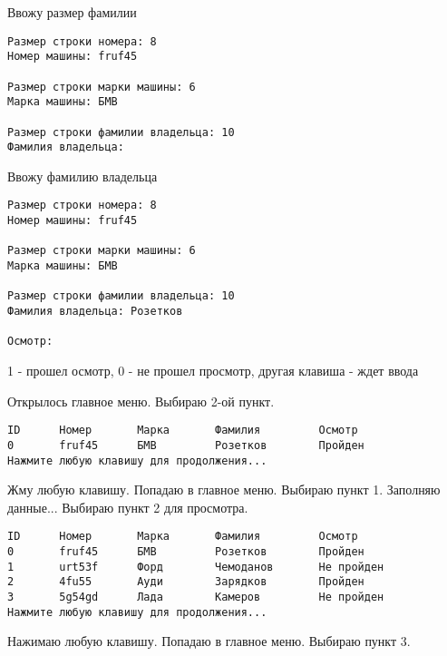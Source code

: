 Ввожу размер фамилии

\begin{tcolorbox}
\begin{verbatim}
Размер строки номера: 8
Номер машины: fruf45

Размер строки марки машины: 6
Марка машины: БМВ

Размер строки фамилии владельца: 10
Фамилия владельца:
\end{verbatim}
\end{tcolorbox}

Ввожу фамилию владельца

\begin{tcolorbox}
\begin{verbatim}
Размер строки номера: 8
Номер машины: fruf45

Размер строки марки машины: 6
Марка машины: БМВ

Размер строки фамилии владельца: 10
Фамилия владельца: Розетков

Осмотр: 
\end{verbatim}
\end{tcolorbox}

1 - прошел осмотр, 0 - не прошел просмотр, другая клавиша - ждет ввода

Открылось главное меню. Выбираю 2-ой пункт.

\begin{tcolorbox}
\begin{verbatim}
ID      Номер       Марка       Фамилия         Осмотр
0       fruf45      БМВ         Розетков        Пройден
Нажмите любую клавишу для продолжения...
\end{verbatim}
\end{tcolorbox}

Жму любую клавишу. Попадаю в главное меню. Выбираю пункт 1. Заполняю данные... Выбираю пункт 2 для просмотра.

\begin{tcolorbox}
\begin{verbatim}
ID      Номер       Марка       Фамилия         Осмотр
0       fruf45      БМВ         Розетков        Пройден
1       urt53f      Форд        Чемоданов       Не пройден
2       4fu55       Ауди        Зарядков        Пройден
3       5g54gd      Лада        Камеров         Не пройден
Нажмите любую клавишу для продолжения...   
\end{verbatim}
\end{tcolorbox}

Нажимаю любую клавишу. Попадаю в главное меню. Выбираю пункт 3.

